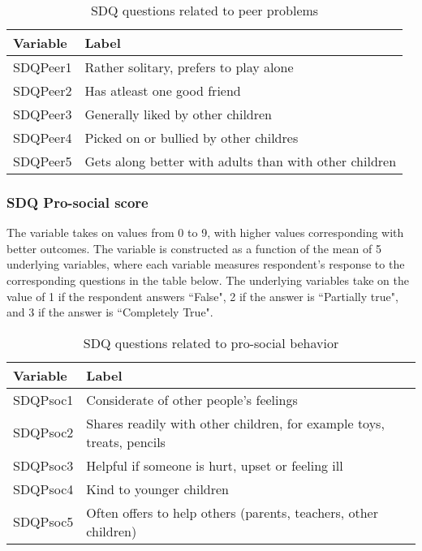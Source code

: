 \begin{table}[H]
\begin{center}
\footnotesize{
\caption{SDQ questions related to peer problems}
\begin{tabular}{l l}
\hline
\textbf{Variable} & \textbf{Label} \\
\hline
SDQPeer1 & Rather solitary, prefers to play alone\\
SDQPeer2 & Has atleast one good friend\\
SDQPeer3 & Generally liked by other children\\
SDQPeer4 & Picked on or bullied by other childres\\
SDQPeer5 & Gets along better with adults than with other children\\
\hline
\end{tabular}
}
\end{center}
\end{table}

\subsubsection{SDQ Pro-social score}
The variable takes on values from 0 to 9, with higher values corresponding with better outcomes. The variable is constructed as a function of the mean of 5 underlying variables, where each variable measures respondent's response to the corresponding questions in the table below. The underlying variables take on the value of 1 if the respondent answers  ``False", 2 if the answer is ``Partially true", and 3 if the answer is ``Completely True".  \\

\begin{table}[H]
\begin{center}
\footnotesize{
\caption{SDQ questions related to pro-social behavior}
\begin{tabular}{l l}
\hline
\textbf{Variable} & \textbf{Label} \\
\hline
SDQPsoc1 & Considerate of other people's feelings\\
SDQPsoc2 & Shares readily with other children, for example toys, treats, pencils\\
SDQPsoc3 & Helpful if someone is hurt, upset or feeling ill\\
SDQPsoc4 & Kind to younger children\\
SDQPsoc5 & Often offers to help others (parents, teachers, other children)\\
\hline
\end{tabular}
}
\end{center}
\end{table}

